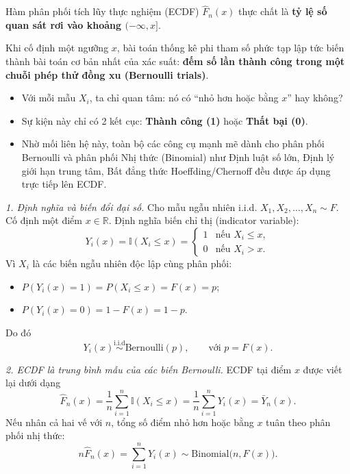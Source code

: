Hàm phân phối tích lũy thực nghiệm (ECDF) $\widehat F_n(x)$ thực chất là \textbf{tỷ lệ số quan sát rơi vào khoảng $(-\infty,x]$}.

Khi cố định một ngưỡng $x$, bài toán thống kê phi tham số phức tạp lập tức biến thành bài toán cơ bản nhất của xác suất: \textbf{đếm số lần thành công trong một chuỗi phép thử đồng xu (Bernoulli trials)}.
\begin{itemize}
\item Với mỗi mẫu $X_i$, ta chỉ quan tâm: nó có ``nhỏ hơn hoặc bằng $x$'' hay không?
\item Sự kiện này chỉ có 2 kết cục: \textbf{Thành công (1)} hoặc \textbf{Thất bại (0)}.
\item Nhờ mối liên hệ này, toàn bộ các công cụ mạnh mẽ dành cho phân phối Bernoulli và phân phối Nhị thức (Binomial) như Định luật số lớn, Định lý giới hạn trung tâm, Bất đẳng thức Hoeffding/Chernoff đều được áp dụng trực tiếp lên ECDF.
\end{itemize}


\textit{1. Định nghĩa và biến đổi đại số.} Cho mẫu ngẫu nhiên i.i.d. $X_1,X_2,\dots,X_n\sim F$. Cố định một điểm $x\in\mathbb{R}$. Định nghĩa biến chỉ thị (indicator variable):
\[
Y_i(x)=\mathbb{I}(X_i\le x)=\begin{cases} 1 & \text{nếu } X_i\le x,\\ 0 & \text{nếu } X_i>x.\end{cases}
\]
Vì $X_i$ là các biến ngẫu nhiên độc lập cùng phân phối:
\begin{itemize}
\item $P(Y_i(x)=1)=P(X_i\le x)=F(x)=p$;
\item $P(Y_i(x)=0)=1-F(x)=1-p$.
\end{itemize}
Do đó
\[ Y_i(x)\overset{\text{i.i.d}}{\sim}\mathrm{Bernoulli}(p),\qquad \text{với } p=F(x). \]

\textit{2. ECDF là trung bình mẫu của các biến Bernoulli.} ECDF tại điểm $x$ được viết lại dưới dạng
\[ \widehat F_n(x)=\frac1n\sum_{i=1}^n \mathbb{I}(X_i\le x)=\frac1n\sum_{i=1}^n Y_i(x)=\bar Y_n(x). \]
Nếu nhân cả hai vế với $n$, tổng số điểm nhỏ hơn hoặc bằng $x$ tuân theo phân phối nhị thức:
\[ n\widehat F_n(x)=\sum_{i=1}^n Y_i(x)\sim \mathrm{Binomial}\big(n,F(x)\big). \]

